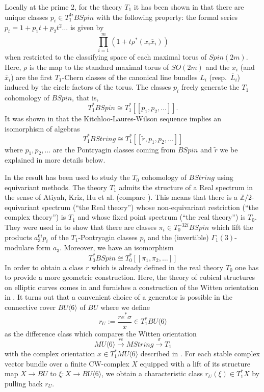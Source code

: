 \documentclass{amsart}
\newcommand {\Z}{{\mathbb Z}}
\numberwithin{equation}{section}
\theoremstyle{definition}  %
\newtheorem{set theory}[thm]{Set Theoretic Prelude}
\begin{document}
Locally at the prime 2, for the theory $T_1$ it has been shown in \cite{MR3471093} that there are unique classes $p_i\in T_1^{4i}BSpin$ with the following property: the formal series  $p_t=1+p_1t+p_2t^2\ldots$ is given by $$ \prod_{i=1}^m (1+t\rho^*(x_i \overline{x}_i))$$
when restricted to the classifying space of each maximal torus of $Spin(2m)$. Here, $\rho$ is the map to the standard maximal torus of $SO(2m)$ and the $x_i$ (and  $\overline{x}_i$) are the first $T_1$-Chern classes of the canonical  line bundles $L_i$ (resp.\ $\overline{L}_i$) induced by the circle factors of the torus. 
The classes $p_i$ freely generate  the $T_1$ cohomology of $BSpin$, that is, 
$$ T_1^*BSpin\cong T_1^*[\! [p_1,p_2,\ldots ]\!].$$
It was shown in \cite{MR3471093} that the Kitchloo-Laures-Wilson sequence implies  an isomorphism of algebras
$$ {T}_1^*BString\cong {T}_1^*[\! [\tilde{r},p_1,p_2,\ldots ]\!] $$
where $p_1,p_2,\ldots$ are the Pontryagin classes coming from $BSpin$ and $\tilde{r}$ we be explained in more details below. 
\par
In \cite{MR3448393} the result has been used to study the $T_0$ cohomology of $BString$ using equivariant methods. The theory $T_1$ admits the structure of a Real spectrum in the sense of Atiyah, Kriz, Hu et al.  (compare \cite{MR0206940}\cite{MR1808224}).
This
means that there is a $\Z/2$-equivariant spectrum (``the Real theory'') whose non-equivariant restriction (``the complex theory'') is $T_1$
and whose fixed point spectrum (``the real theory'') is $T_0$. 
They were used in \cite{MR3448393} to show that there are classes  $\pi _i\in T_0^{-32i}BSpin$ which lift the products $a_3^{6i}p_i$ of the $T_1$-Pontryagin classes $p_i$ and the (invertible) $\Gamma_1(3)$-modulare form $a_3$. Moreover, we have an isomorphism 
$$ T_0^{*}BSpin\cong T_0^*[\![ \pi _1,\pi _2,\ldots]\!]$$
In order to obtain a class $r$ which is already defined in the real theory $T_0$ one has to provide a more geometric construction. Here, the theory of cubical structures on elliptic curves comes in and furnishes a construction of the  Witten orientation in \cite{ MR1869850}. It turns out that a convenient choice of a generator is possible in the connective cover $BU\langle 6 \rangle$ of $BU$ where we define
$$r_U:=\frac{re^*\sigma}{x}\in T_1^*BU\langle 6\rangle$$ as the difference class which compares the Witten orientation $$MU\langle 6 \rangle\stackrel{re}{\to}MString\stackrel{\sigma}{\to} T_1$$ with the complex orientation
$x\in T_1^*MU\langle 6\rangle$ described in \cite[p513f]{MR3448393}. 
For each stable complex vector bundle over a finite CW-complex $X$ equipped with a lift of its structure map $X\to BU$ to $\xi:X\to BU\langle 6\rangle$, we obtain a characteristic class 
$r_U(\xi)\in T_1^*X$ by pulling back $r_U$.
\end{document}
